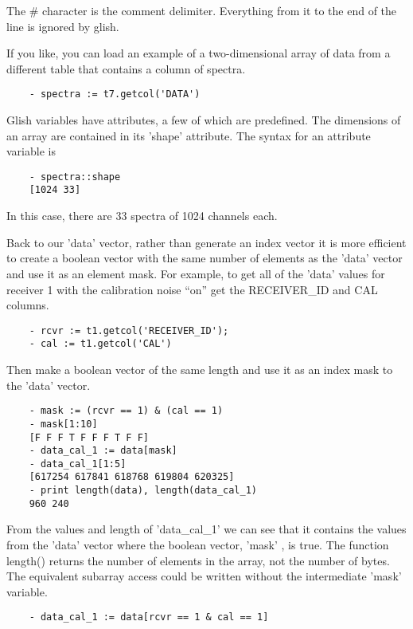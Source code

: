 The \# character is the comment delimiter.  Everything from it to the end of
the line is ignored by glish.

    If you like, you can load an example of a two-dimensional array of data
from a different table that contains a column of spectra.

\begin{verbatim}
	- spectra := t7.getcol('DATA')
\end{verbatim}

    Glish variables have attributes, a few of which are predefined.  The
dimensions of an array are contained in its 'shape' attribute.  The syntax
for an attribute variable is

\begin{verbatim}
	- spectra::shape
	[1024 33]
\end{verbatim}

In this case, there are 33 spectra of 1024 channels each.

    Back to our 'data' vector, rather than generate an index vector it is
more efficient to create a boolean vector with the same number of elements
as the 'data' vector and use it as an element mask.  For example, to get
all of the 'data' values for receiver 1 with the calibration noise ``on'' get
the RECEIVER\_ID and CAL columns.

\begin{verbatim}
	- rcvr := t1.getcol('RECEIVER_ID');
	- cal := t1.getcol('CAL')
\end{verbatim}

Then make a boolean vector of the same length and use it as an index mask
to the 'data' vector.

\begin{verbatim}
	- mask := (rcvr == 1) & (cal == 1)
	- mask[1:10]
	[F F F T F F F T F F]  
	- data_cal_1 := data[mask]
	- data_cal_1[1:5]
	[617254 617841 618768 619804 620325]
	- print length(data), length(data_cal_1)
	960 240
\end{verbatim}

From the values and length of 'data\_cal\_1' we can see that it contains the
values from the 'data' vector where the boolean vector, 'mask' , is true.
The function length() returns the number of elements in the array, not the
number of bytes.  The equivalent subarray access could be written without
the intermediate 'mask' variable.

\begin{verbatim}
	- data_cal_1 := data[rcvr == 1 & cal == 1]
\end{verbatim}

